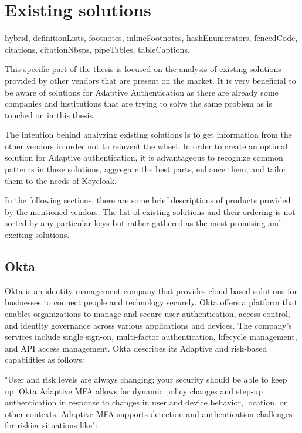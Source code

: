 \documentclass[
  digital,     %
  oneside,     %
  nosansbold,  %
  nocolorbold, %
  lof,         %
  lot,         %
]{fithesis4}
\begin{document}
\chapter{Existing solutions}
\shorthandoff{-}
\begin{markdown*}{%
  hybrid,
  definitionLists,
  footnotes,
  inlineFootnotes,
  hashEnumerators,
  fencedCode,
  citations,
  citationNbsps,
  pipeTables,
  tableCaptions,
}

This specific part of the thesis is focused on the analysis of existing solutions provided by other vendors that are present on the market.
It is very beneficial to be aware of solutions for Adaptive Authentication as there are already some companies and institutions that are trying to solve the same problem as is touched on in this thesis.

The intention behind analyzing existing solutions is to get information from the other vendors in order not to reinvent the wheel.
In order to create an optimal solution for Adaptive authentication, it is advantageous to recognize common patterns in these solutions, aggregate the best parts, enhance them, and tailor them to the needs of Keycloak. 

In the following sections, there are some brief descriptions of products provided by the mentioned vendors.
The list of existing solutions and their ordering is not sorted by any particular keys but rather gathered as the most promising and exciting solutions.

\section{Okta}
Okta is an identity management company that provides cloud-based solutions for businesses to connect people and technology securely.
Okta offers a platform that enables organizations to manage and secure user authentication, access control, and identity governance across various applications and devices.
The company's services include single sign-on, multi-factor authentication, lifecycle management, and API access management.
Okta describes its Adaptive and risk-based capabilities as follows:

"User and risk levels are always changing; your security should be able to keep up.
Okta Adaptive MFA allows for dynamic policy changes and step-up authentication in response to changes in user and device behavior, location, or other contexts.
Adaptive MFA supports detection and authentication challenges for riskier situations like":


\end{markdown*}
\end{document}

